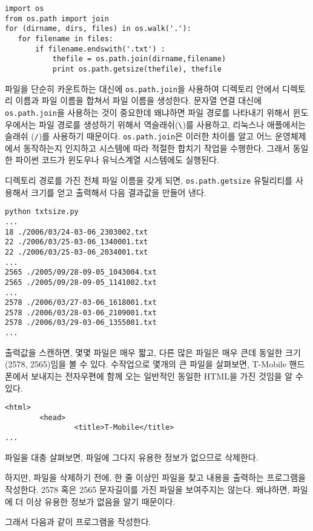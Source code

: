 \beforeverb
\begin{verbatim}
import os
from os.path import join
for (dirname, dirs, files) in os.walk('.'):
   for filename in files:
       if filename.endswith('.txt') :
           thefile = os.path.join(dirname,filename)
           print os.path.getsize(thefile), thefile
\end{verbatim}
\afterverb
%

파일을 단순히 카운트하는 대신에 {\tt os.path.join}을 사용하여 디렉토리 안에서 
디렉토리 이름과 파일 이름을 합쳐서 파일 이름을 생성한다.
문자열 연결 대신에 {\tt os.path.join}을 사용하는 것이 중요한데 왜냐하면
파일 경로를 나타내기 위해서 윈도우에서는 파일 경로를 생성하기 위해서 역슬래쉬(\verb"\")를 사용하고,
리눅스나 애플에서는 슬래쉬 (\verb"/")를 사용하기 때문이다.
{\tt os.path.join}은 이러한 차이를 알고 어느 운영체제에서 동작하는지 인지하고 시스템에 따라
적절한 합치기 작업을 수행한다. 
그래서 동일한 파이썬 코드가 윈도우나 유닉스계열 시스템에도 실행된다.

디렉토리 경로를 가진 전체 파일 이름을 갖게 되면, {\tt os.path.getsize} 유틸리티를 사용해서
크기를 얻고 출력해서 다음 결과값을 만들어 낸다.

\beforeverb
\begin{verbatim}
python txtsize.py
...
18 ./2006/03/24-03-06_2303002.txt
22 ./2006/03/25-03-06_1340001.txt
22 ./2006/03/25-03-06_2034001.txt
...
2565 ./2005/09/28-09-05_1043004.txt
2565 ./2005/09/28-09-05_1141002.txt
...
2578 ./2006/03/27-03-06_1618001.txt
2578 ./2006/03/28-03-06_2109001.txt
2578 ./2006/03/29-03-06_1355001.txt
...
\end{verbatim}
\afterverb
%


출력값을 스캔하면, 몇몇 파일은 매우 짧고, 다른 많은 파일은 매우 큰데 동일한 크기(2578, 2565)임을 볼 수 있다.
수작업으로 몇개의 큰 파일을 살펴보면, 
T-Mobile 핸드폰에서 보내지는 전자우편에 함께 오는 일반적인 동일한 HTML을 가진 것임을 알 수 있다.  

\beforeverb
\begin{verbatim}
<html>
        <head>
                <title>T-Mobile</title>
...
\end{verbatim}
\afterverb
%

파일을 대충 살펴보면, 파일에 그다지 유용한 정보가 없으므로 삭제한다.

하지만, 파일을 삭제하기 전에, 한 줄 이상인 파일을 찾고 내용을 출력하는 프로그램을 작성한다.
2578 혹은 2565 문자길이를 가진 파일을 보여주지는 않는다. 
왜냐하면, 파일에 더 이상 유용한 정보가 없음을 알기 때문이다.

그래서 다음과 같이 프로그램을 작성한다.

